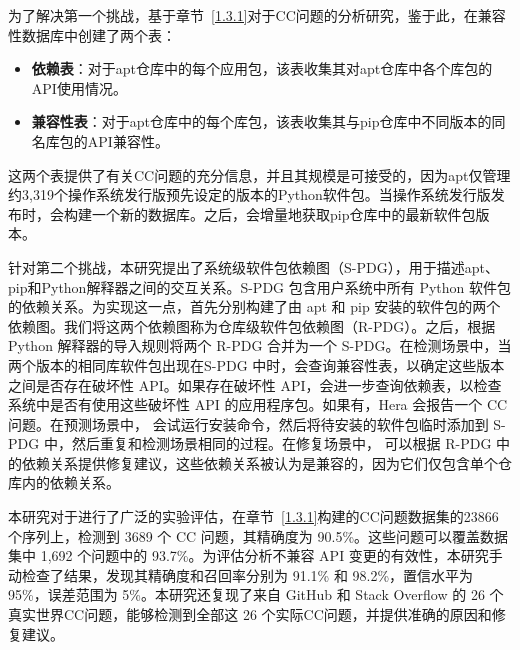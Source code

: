 为了解决第一个挑战，基于章节~\ref{1.3.1}对于CC问题的分析研究，鉴于此，\tool{}在兼容性数据库中创建了两个表：
\begin{itemize}
	\item \textbf{依赖表}：对于apt仓库中的每个应用包，该表收集其对apt仓库中各个库包的API使用情况。
	\item\textbf{兼容性表}：对于apt仓库中的每个库包，该表收集其与pip仓库中不同版本的同名库包的API兼容性。
\end{itemize}
这两个表提供了有关CC问题的充分信息，并且其规模是可接受的，因为apt仅管理约3,319个操作系统发行版预先设定的版本的Python软件包。当操作系统发行版发布时，\tool{}会构建一个新的数据库。之后，\tool{}会增量地获取pip仓库中的最新软件包版本。

针对第二个挑战，本研究提出了系统级软件包依赖图（S-PDG），用于描述apt、pip和Python解释器之间的交互关系。S-PDG 包含用户系统中所有 Python 软件包的依赖关系。为实现这一点，\tool{}首先分别构建了由 apt 和 pip 安装的软件包的两个依赖图。我们将这两个依赖图称为仓库级软件包依赖图（R-PDG）。之后，\tool{}根据 Python 解释器的导入规则将两个 R-PDG 合并为一个 S-PDG。在检测场景中，当两个版本的相同库软件包出现在S-PDG 中时，\tool{}会查询兼容性表，以确定这些版本之间是否存在破坏性 API。如果存在破坏性 API，\tool{}会进一步查询依赖表，以检查系统中是否有使用这些破坏性 API 的应用程序包。如果有，Hera 会报告一个 CC 问题。在预测场景中，\tool{} 会试运行安装命令，然后将待安装的软件包临时添加到 S-PDG 中，然后重复和检测场景相同的过程。在修复场景中，\tool{} 可以根据 R-PDG 中的依赖关系提供修复建议，这些依赖关系被认为是兼容的，因为它们仅包含单个仓库内的依赖关系。

本研究对于\tool{}进行了广泛的实验评估，在章节~\ref{1.3.1}构建的CC问题数据集的23866个序列上，\tool{}检测到 3689 个 CC 问题，其精确度为 90.5\%。这些问题可以覆盖数据集中 1,692 个问题中的 93.7\%。为评估分析不兼容 API 变更的有效性，本研究手动检查了结果，发现其精确度和召回率分别为 91.1\% 和 98.2\%，置信水平为 95\%，误差范围为 5\%。本研究还复现了来自 GitHub 和 Stack Overflow 的 26 个真实世界CC问题，\tool{}能够检测到全部这 26 个实际CC问题，并提供准确的原因和修复建议。
